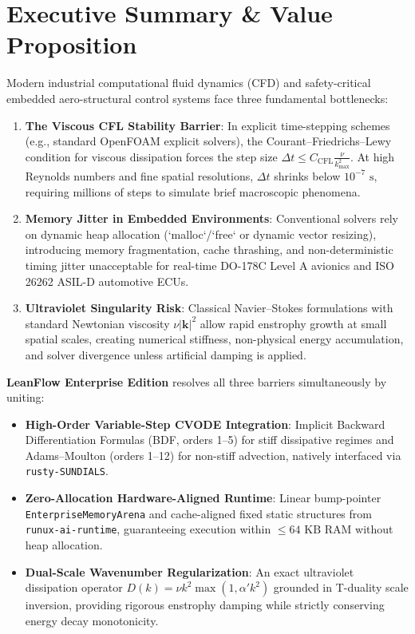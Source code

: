 \documentclass[10pt,twocolumn]{article}
\begin{document}
\section{Executive Summary \& Value Proposition}

Modern industrial computational fluid dynamics (CFD) and safety-critical embedded aero-structural control systems face three fundamental bottlenecks:
\begin{enumerate}[leftmargin=*]
  \setlength\itemsep{1pt}
  \item \textbf{The Viscous CFL Stability Barrier}: In explicit time-stepping schemes (e.g., standard OpenFOAM explicit solvers), the Courant--Friedrichs--Lewy condition for viscous dissipation forces the step size $\Delta t \le C_{\text{CFL}} \frac{\nu}{k_{\max}^2}$. At high Reynolds numbers and fine spatial resolutions, $\Delta t$ shrinks below $10^{-7}\text{ s}$, requiring millions of steps to simulate brief macroscopic phenomena.
  \item \textbf{Memory Jitter in Embedded Environments}: Conventional solvers rely on dynamic heap allocation (`malloc`/`free` or dynamic vector resizing), introducing memory fragmentation, cache thrashing, and non-deterministic timing jitter unacceptable for real-time DO-178C Level A avionics and ISO 26262 ASIL-D automotive ECUs.
  \item \textbf{Ultraviolet Singularity Risk}: Classical Navier--Stokes formulations with standard Newtonian viscosity $\nu |\mathbf{k}|^2$ allow rapid enstrophy growth at small spatial scales, creating numerical stiffness, non-physical energy accumulation, and solver divergence unless artificial damping is applied.
\end{enumerate}

\textbf{LeanFlow Enterprise Edition} resolves all three barriers simultaneously by uniting:
\begin{itemize}[leftmargin=*]
  \setlength\itemsep{1pt}
  \item \textbf{High-Order Variable-Step CVODE Integration}: Implicit Backward Differentiation Formulas (BDF, orders 1--5) for stiff dissipative regimes and Adams--Moulton (orders 1--12) for non-stiff advection, natively interfaced via \texttt{rusty-SUNDIALS}.
  \item \textbf{Zero-Allocation Hardware-Aligned Runtime}: Linear bump-pointer \texttt{EnterpriseMemoryArena} and cache-aligned fixed static structures from \texttt{runux-ai-runtime}, guaranteeing execution within $\le 64\text{ KB}$ RAM without heap allocation.
  \item \textbf{Dual-Scale Wavenumber Regularization}: An exact ultraviolet dissipation operator $D(k) = \nu k^2 \max(1, \alpha' k^2)$ grounded in T-duality scale inversion, providing rigorous enstrophy damping while strictly conserving energy decay monotonicity.
\end{itemize}
\end{document}
